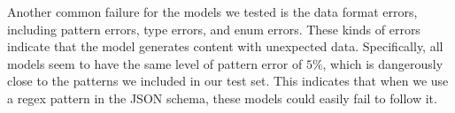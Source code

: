 Another common failure for the models we tested is the data format errors, including pattern errors, type errors, and enum errors.
These kinds of errors indicate that the model generates content with unexpected data.
Specifically, all models seem to have the same level of pattern error of $5\%$, which is dangerously close to the patterns we included in our test set.
This indicates that when we use a regex pattern in the JSON schema, these models could easily fail to follow it.
